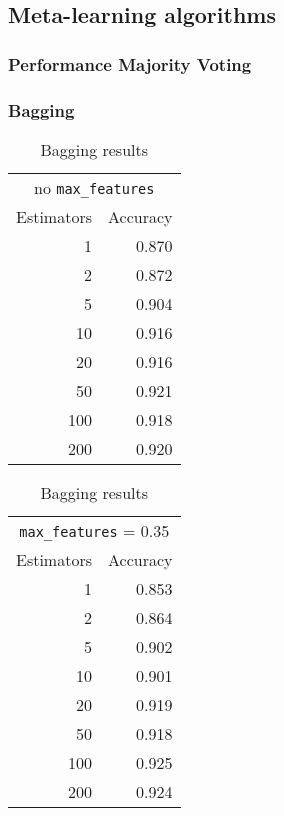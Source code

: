 
\subsection{Meta-learning algorithms}%
\label{sub:meta}

\pagebreak
\subsubsection{Performance Majority Voting}
 
\pagebreak
\subsubsection{Bagging}

\begin{table}[H]
\centering
\caption{Bagging results}%
\label{tab:bagging}
\begin{tabular}{rr}
\toprule
\multicolumn{2}{c}{no \texttt{max\_features}}\\
Estimators & Accuracy \\
\midrule
1   & 0.870 \\
2   & 0.872 \\
5   & 0.904 \\
10  & 0.916 \\
20  & 0.916 \\
50  & 0.921 \\
100 & 0.918 \\
200 & 0.920 \\
\bottomrule
\end{tabular}
\quad
\begin{tabular}{rr}
\toprule
\multicolumn{2}{c}{\texttt{max\_features} = 0.35}\\
Estimators & Accuracy \\
\midrule
1  & 0.853 \\
2  & 0.864 \\
5  & 0.902 \\
10 & 0.901  \\
20 & 0.919  \\
50 & 0.918  \\
100 & 0.925   \\
200 & 0.924 \\
\bottomrule
\end{tabular}
\end{table}

\begin{verbatim}
\end{verbatim}
 

